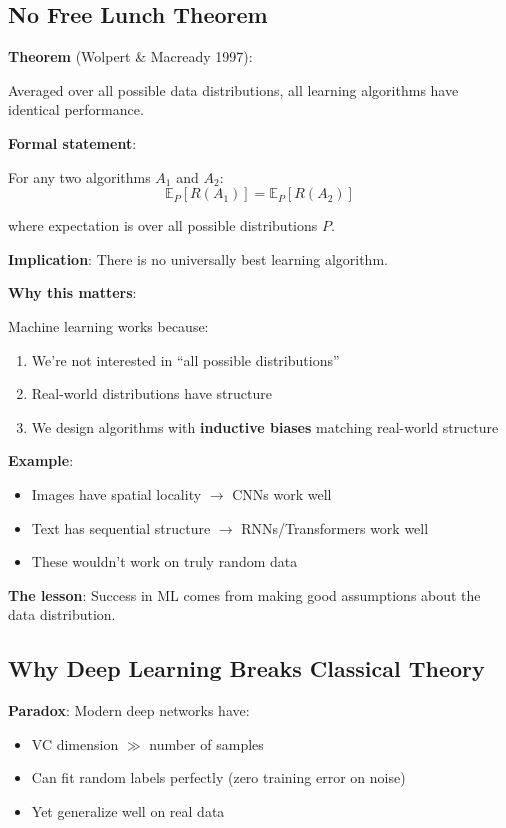\subsection{No Free Lunch Theorem}

\textbf{Theorem} (Wolpert \& Macready 1997):

Averaged over all possible data distributions, all learning algorithms have identical performance.

\textbf{Formal statement}:

For any two algorithms $A_1$ and $A_2$:
\begin{equation}
\mathbb{E}_P [R(A_1)] = \mathbb{E}_P [R(A_2)]
\end{equation}

where expectation is over all possible distributions $P$.

\textbf{Implication}: There is no universally best learning algorithm.

\textbf{Why this matters}:

Machine learning works because:
\begin{enumerate}
    \item We're not interested in ``all possible distributions''
    \item Real-world distributions have structure
    \item We design algorithms with \textbf{inductive biases} matching real-world structure
\end{enumerate}

\textbf{Example}:
\begin{itemize}
    \item Images have spatial locality $\rightarrow$ CNNs work well
    \item Text has sequential structure $\rightarrow$ RNNs/Transformers work well
    \item These wouldn't work on truly random data
\end{itemize}

\begin{insightbox}
\textbf{The lesson}: Success in ML comes from making good assumptions about the data distribution.
\end{insightbox}

\subsection{Why Deep Learning Breaks Classical Theory}

\textbf{Paradox}: Modern deep networks have:
\begin{itemize}
    \item VC dimension $\gg$ number of samples
    \item Can fit random labels perfectly (zero training error on noise)
    \item Yet generalize well on real data
\end{itemize}

